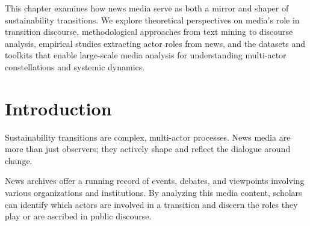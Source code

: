 \documentclass[../main.tex]{subfiles}
\begin{document}

\begin{center}
\end{center}

\vspace{0.5cm}

\begin{chapteroverview}
This chapter examines how news media serve as both a mirror and shaper of sustainability transitions. We explore theoretical perspectives on media's role in transition discourse, methodological approaches from text mining to discourse analysis, empirical studies extracting actor roles from news, and the datasets and toolkits that enable large-scale media analysis for understanding multi-actor constellations and systemic dynamics.
\end{chapteroverview}


\section*{Introduction}

Sustainability transitions are complex, multi-actor processes. News media are more than just observers; they actively shape and reflect the dialogue around change.


\begin{insightbox}
News archives offer a running record of events, debates, and viewpoints involving various organizations and institutions. By analyzing this media content, scholars can identify which actors are involved in a transition and discern the roles they play or are ascribed in public discourse.
\end{insightbox}
\end{document}
